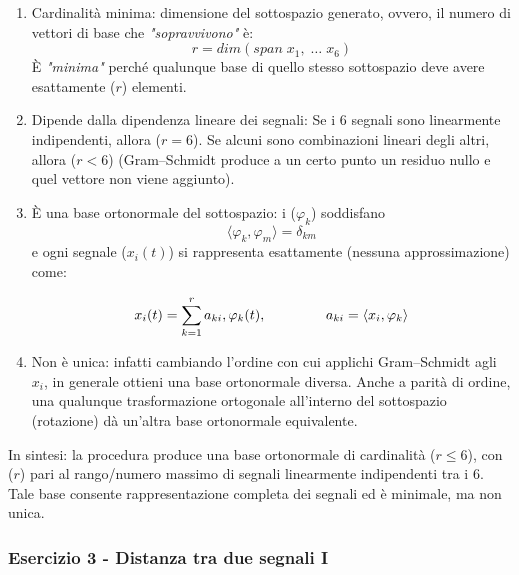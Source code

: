 \documentclass[../main.tex]{subfiles}
\begin{document}
\begin{enumerate}[label=\textbf{-}]
	\item Cardinalità minima: dimensione del sottospazio generato, ovvero, il numero di vettori di base che \textit{"sopravvivono"} è:
		\begin{equation}
			r = \unit{dim} (\unit{span\;} x_1,\; \dots \; x_6)
		\end{equation}
		È \textit{"minima"} perché qualunque base di quello stesso sottospazio deve avere esattamente ($r$) elementi.
		
	\item Dipende dalla dipendenza lineare dei segnali: Se i 6 segnali sono linearmente indipendenti, allora ($r=6$). Se alcuni sono combinazioni lineari degli altri, allora ($r<6$) (Gram–Schmidt produce a un certo punto un residuo nullo e quel vettore non viene aggiunto).
	\item È una base ortonormale del sottospazio: i ($\varphi_k$) soddisfano
		\begin{equation}
			\langle \varphi_k , \varphi_m \rangle = \delta_{km}
		\end{equation}
		e ogni segnale ($x_i(t)$) si rappresenta esattamente (nessuna approssimazione) come:
		
		\begin{equation}
			x_i(t) = \sum_{k = 1}^r a_{ki}, \varphi_k(t), \hspace{1.5cm} a_{ki} = \langle x_i, \varphi_k \rangle
		\end{equation}
	\item Non è unica: infatti cambiando l’ordine con cui applichi Gram–Schmidt agli $x_i$, in generale ottieni una base ortonormale diversa. Anche a parità di ordine, una qualunque trasformazione ortogonale all’interno del sottospazio (rotazione) dà un’altra base ortonormale equivalente.


\end{enumerate}

In sintesi: la procedura produce una base ortonormale di cardinalità ($r\le 6$), con ($r$) pari al rango/numero massimo di segnali linearmente indipendenti tra i 6. Tale base consente rappresentazione completa dei segnali ed è minimale, ma non unica.


\vspace*{1.5cm}
\subsubsection{Esercizio 3 - Distanza tra due segnali I}
\label{extra13}
\end{document}
